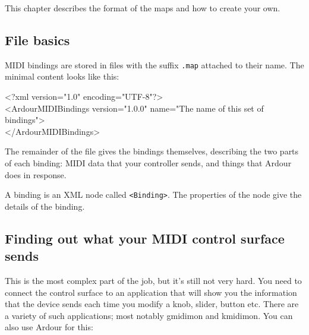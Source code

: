 \documentclass[10pt,a4paper]{book}
\begin{document}
{This chapter describes the format of the maps and how to create your own.


\subsection{File basics}

MIDI bindings are stored in files with the suffix \texttt{.map}
attached to their name. The minimal content looks like this:

\begin{listing}
<?xml version="1.0" encoding="UTF-8"?>\\
<ArdourMIDIBindings version="1.0.0" name="The name of this set of bindings">\\
</ArdourMIDIBindings>\\
\end{listing}

The remainder of the file gives the bindings themselves, describing
the two parts of each binding: MIDI data that your controller sends,
and things that Ardour does in response.

A binding is an XML node called \texttt{<Binding>}.  The properties of the
node give the details of the binding.  



\subsection{Finding out what your MIDI control surface sends}

This is the most complex part of the job, but it's still not very hard.
You need to connect the control surface to an application that will
show you the information that the device sends each time you modify a
knob, slider, button etc.  There are a variety of such applications;
most notably gmidimon and kmidimon.  You can also use Ardour for this:

}
\end{document}
